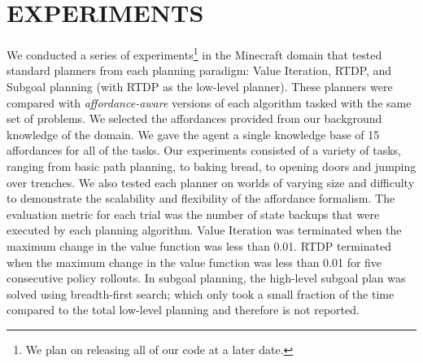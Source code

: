 \documentclass[]{article}
\newcommand{\stnote}[1]{\textcolor{Blue}{\textbf{ST: #1}}}
\newcommand{\jmnote}[1]{\textcolor{Green}{\textbf{JM: #1}}}
\begin{document}




\section{EXPERIMENTS}

%


We conducted a series of experiments\footnote{We plan on releasing all of our code at a later date.} in the Minecraft domain that
tested standard planners from each planning paradigm: Value Iteration,
RTDP, and Subgoal planning (with RTDP as the low-level planner). These
planners were compared with {\it affordance-aware} versions of each
algorithm tasked with the same set of problems. We selected the
affordances provided from our background knowledge of the domain.  We gave the agent  a single knowledge base of 15 affordances for all of the tasks.
Our experiments consisted of a variety of tasks, ranging from basic path planning, to baking bread,
to opening doors and jumping over trenches.  We also tested each
planner on worlds of varying size and difficulty to demonstrate the
scalability and flexibility of the affordance formalism. The
evaluation metric for each trial was the number of state backups that
were executed by each planning algorithm. Value
Iteration was terminated when the maximum change in the value function
was less than 0.01. RTDP terminated when the maximum change in the
value function was less than 0.01 for five consecutive policy
rollouts. In subgoal planning, the high-level subgoal plan was solved
using breadth-first search; which only took a small fraction of the
time compared to the total low-level planning and therefore is not
reported.
\end{document}
